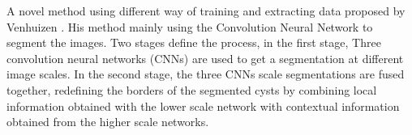 A novel method using different way of training and extracting data proposed by Venhuizen \cite{venhuizen2015autCNN}.
His method mainly using the Convolution Neural Network to segment the images.
Two stages define the process, in the first stage, Three convolution neural networks (CNNs) are used to get a segmentation at different image scales.
In the second stage, the three CNNs scale segmentations are fused together, redefining the borders of the segmented cysts by combining local information obtained with the lower scale network with contextual information obtained from the higher scale networks.




%
%

